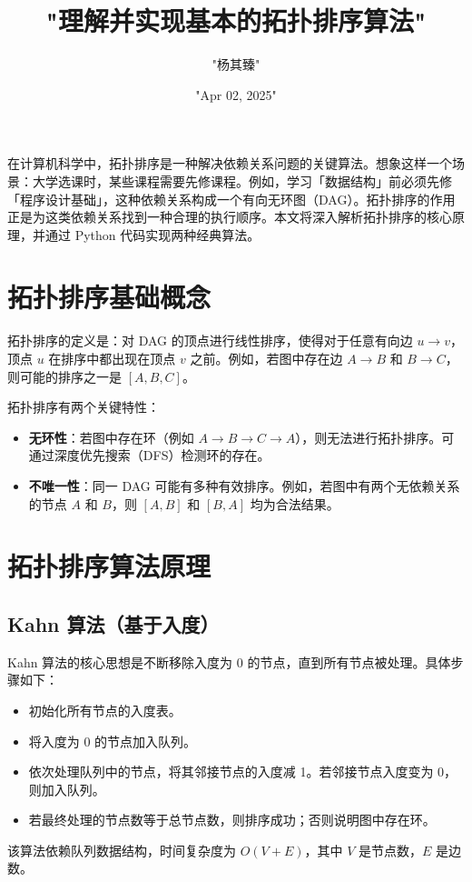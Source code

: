 \title{"理解并实现基本的拓扑排序算法"}
\author{"杨其臻"}
\date{"Apr 02, 2025"}
\maketitle
在计算机科学中，拓扑排序是一种解决依赖关系问题的关键算法。想象这样一个场景：大学选课时，某些课程需要先修课程。例如，学习「数据结构」前必须先修「程序设计基础」，这种依赖关系构成一个有向无环图（DAG）。拓扑排序的作用正是为这类依赖关系找到一种合理的执行顺序。本文将深入解析拓扑排序的核心原理，并通过 Python 代码实现两种经典算法。\par
\chapter{拓扑排序基础概念}
拓扑排序的定义是：对 DAG 的顶点进行线性排序，使得对于任意有向边 $u \to v$，顶点 $u$ 在排序中都出现在顶点 $v$ 之前。例如，若图中存在边 $A \to B$ 和 $B \to C$，则可能的排序之一是 $[A, B, C]$。\par
拓扑排序有两个关键特性：\par
\begin{itemize}
\item \textbf{无环性}：若图中存在环（例如 $A \to B \to C \to A$），则无法进行拓扑排序。可通过深度优先搜索（DFS）检测环的存在。
\item \textbf{不唯一性}：同一 DAG 可能有多种有效排序。例如，若图中有两个无依赖关系的节点 $A$ 和 $B$，则 $[A, B]$ 和 $[B, A]$ 均为合法结果。
\end{itemize}
\chapter{拓扑排序算法原理}
\section{Kahn 算法（基于入度）}
Kahn 算法的核心思想是不断移除入度为 0 的节点，直到所有节点被处理。具体步骤如下：\par
\begin{itemize}
\item 初始化所有节点的入度表。
\item 将入度为 0 的节点加入队列。
\item 依次处理队列中的节点，将其邻接节点的入度减 1。若邻接节点入度变为 0，则加入队列。
\item 若最终处理的节点数等于总节点数，则排序成功；否则说明图中存在环。
\end{itemize}
该算法依赖队列数据结构，时间复杂度为 $O(V + E)$，其中 $V$ 是节点数，$E$ 是边数。\par
